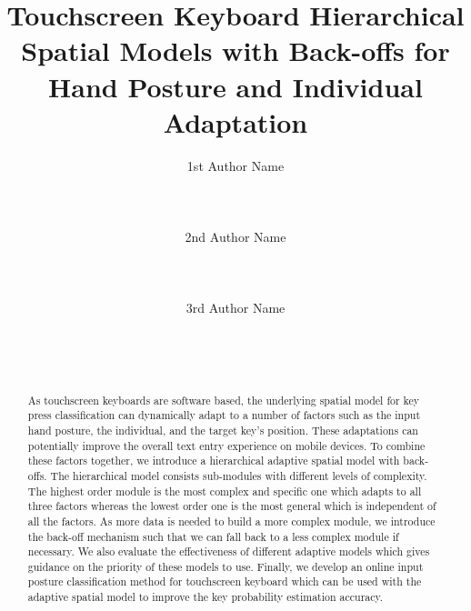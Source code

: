\documentclass{sigchi}
\begin{document}
\title{Touchscreen Keyboard Hierarchical Spatial Models with Back-offs for
Hand Posture and Individual Adaptation}

\author{
  \alignauthor 1st Author Name\\
    \\
    \\
    \\
  \alignauthor 2nd Author Name\\
    \\
    \\
    \\
  \alignauthor 3rd Author Name\\
    \\
    \\
    \\
}


\maketitle

\begin{abstract}
As touchscreen keyboards are software based, the underlying spatial model for key press
classification can dynamically adapt to a number of factors such as the input 
hand posture, the individual, and the target key's position. These adaptations can
potentially improve the overall text entry experience on mobile devices. To 
combine these factors together, we introduce a hierarchical adaptive spatial 
model with back-offs. The hierarchical model consists sub-modules with different levels of
complexity. The highest order module is the most complex and specific one which adapts to 
all three factors whereas the lowest order one is the most general which is independent
of all the factors. As more data is needed to build a more complex module, we introduce
the back-off mechanism such that we can fall back to a less complex module if necessary.
We also evaluate the effectiveness of different adaptive models which gives 
guidance on the priority of these models to use. Finally, we
develop an online input posture classification method for touchscreen keyboard which can be
used with the adaptive spatial model to improve the key probability estimation accuracy.
 
\end{abstract}
\end{document}
